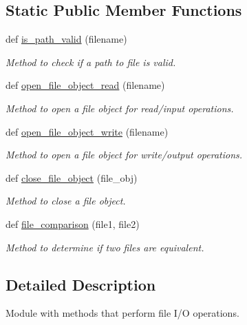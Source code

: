 \subsection*{Static Public Member Functions}
\begin{DoxyCompactItemize}
\item 
def \hyperlink{classutilities_1_1file__io_1_1file__io__operations_a5c4be751037b1ba20bb57884b93e7445}{is\+\_\+path\+\_\+valid} (filename)
\begin{DoxyCompactList}\small\item\em Method to check if a path to file is valid. \end{DoxyCompactList}\item 
def \hyperlink{classutilities_1_1file__io_1_1file__io__operations_a1a7ef324955033ad370338fe37e68194}{open\+\_\+file\+\_\+object\+\_\+read} (filename)
\begin{DoxyCompactList}\small\item\em Method to open a file object for read/input operations. \end{DoxyCompactList}\item 
def \hyperlink{classutilities_1_1file__io_1_1file__io__operations_aaf94e26da1d988ece479d1600ad1de4a}{open\+\_\+file\+\_\+object\+\_\+write} (filename)
\begin{DoxyCompactList}\small\item\em Method to open a file object for write/output operations. \end{DoxyCompactList}\item 
def \hyperlink{classutilities_1_1file__io_1_1file__io__operations_a15cce5bd7767b057cdc569f393c24866}{close\+\_\+file\+\_\+object} (file\+\_\+obj)
\begin{DoxyCompactList}\small\item\em Method to close a file object. \end{DoxyCompactList}\item 
def \hyperlink{classutilities_1_1file__io_1_1file__io__operations_a9b3808ff6b165f5e73b780036f73a917}{file\+\_\+comparison} (file1, file2)
\begin{DoxyCompactList}\small\item\em Method to determine if two files are equivalent. \end{DoxyCompactList}\end{DoxyCompactItemize}


\subsection{Detailed Description}
Module with methods that perform file I/\+O operations. 



